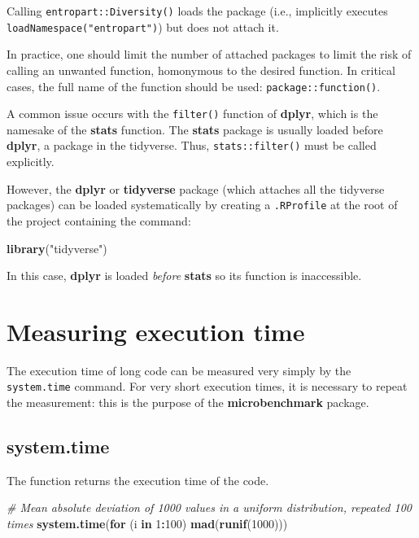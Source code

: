 \documentclass[
  12pt,
  american,
  a4paper,
  extrafontsizes,onecolumn,openright
  ]{memoir}
\newenvironment{Shaded}{\begin{snugshade}}{\end{snugshade}}
\newcommand{\CommentTok}[1]{\textcolor[rgb]{0.56,0.35,0.01}{\textit{#1}}}
\newcommand{\ControlFlowTok}[1]{\textcolor[rgb]{0.13,0.29,0.53}{\textbf{#1}}}
\newcommand{\DecValTok}[1]{\textcolor[rgb]{0.00,0.00,0.81}{#1}}
\newcommand{\FunctionTok}[1]{\textcolor[rgb]{0.13,0.29,0.53}{\textbf{#1}}}
\newcommand{\NormalTok}[1]{#1}
\newcommand{\SpecialCharTok}[1]{\textcolor[rgb]{0.81,0.36,0.00}{\textbf{#1}}}
\newcommand{\StringTok}[1]{\textcolor[rgb]{0.31,0.60,0.02}{#1}}
\begin{document}
Calling \texttt{entropart::Diversity()} loads the package (i.e., implicitly executes \texttt{loadNamespace("entropart")}) but does not attach it.

In practice, one should limit the number of attached packages to limit the risk of calling an unwanted function, homonymous to the desired function.
In critical cases, the full name of the function should be used: \texttt{package::function()}.

A common issue occurs with the \texttt{filter()} function of \textbf{dplyr}, which is the namesake of the \textbf{stats} function.
The \textbf{stats} package is usually loaded before \textbf{dplyr}, a package in the tidyverse.
Thus, \texttt{stats::filter()} must be called explicitly.

However, the \textbf{dplyr} or \textbf{tidyverse} package (which attaches all the tidyverse packages) can be loaded systematically by creating a \texttt{.RProfile} at the root of the project containing the command:

\scriptsize

\begin{Shaded}
\begin{Highlighting}[]
\FunctionTok{library}\NormalTok{(}\StringTok{"tidyverse"}\NormalTok{)}
\end{Highlighting}
\end{Shaded}

\normalsize

In this case, \textbf{dplyr} is loaded \emph{before} \textbf{stats} so its function is inaccessible.

\section{Measuring execution time}\label{measuring-execution-time}

The execution time of long code can be measured very simply by the \texttt{system.time} command.
For very short execution times, it is necessary to repeat the measurement: this is the purpose of the \textbf{microbenchmark} package.

\subsection{system.time}\label{system.time}

The function returns the execution time of the code.

\scriptsize

\begin{Shaded}
\begin{Highlighting}[]
\CommentTok{\# Mean absolute deviation of 1000 values in a uniform distribution, repeated 100 times}
\FunctionTok{system.time}\NormalTok{(}\ControlFlowTok{for}\NormalTok{ (i }\ControlFlowTok{in} \DecValTok{1}\SpecialCharTok{:}\DecValTok{100}\NormalTok{) }\FunctionTok{mad}\NormalTok{(}\FunctionTok{runif}\NormalTok{(}\DecValTok{1000}\NormalTok{)))}
\end{Highlighting}
\end{Shaded}
\end{document}
